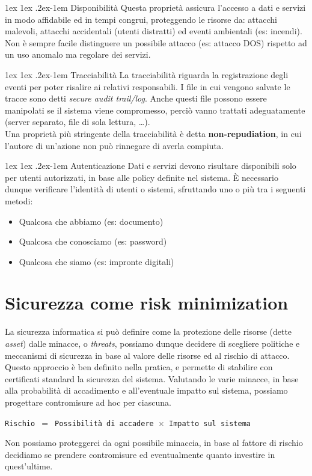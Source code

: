 \documentclass[a4paper, 11pt, notitlepage, fleqn]{report}
\makeatletter
\renewcommand{\paragraph}{%
	\@startsection{paragraph}{4}%
	{\z@}{1ex \@plus 1ex \@minus .2ex}{-1em}%
	{\normalfont\normalsize\bfseries}%
}
\makeatother
\begin{document}
\paragraph{Disponibilità}
Questa proprietà assicura l'accesso a dati e servizi in modo affidabile ed in tempi congrui, proteggendo le risorse da: attacchi malevoli, attacchi accidentali (utenti distratti) ed eventi ambientali (es: incendi).\\
Non è sempre facile distinguere un possibile attacco (es: attacco DOS) rispetto ad un uso anomalo ma regolare dei servizi.

\paragraph{Tracciabilità}
La tracciabilità riguarda la registrazione degli eventi per poter risalire ai relativi responsabili. I file in cui vengono salvate le tracce sono detti \emph{secure audit trail/log}. Anche questi file possono essere manipolati se il sistema viene compromesso, perciò vanno trattati adeguatamente (server separato, file di sola lettura, \dots).\\
Una proprietà più stringente della tracciabilità è detta \textbf{non-repudiation}, in cui l'autore di un'azione non può rinnegare di averla compiuta.

\paragraph{Autenticazione}
Dati e servizi devono risultare disponibili solo per utenti autorizzati, in base alle policy definite nel sistema. \`E necessario dunque verificare l'identità di utenti o sistemi, sfruttando uno o più tra i seguenti metodi:
\begin{itemize}
	\item Qualcosa che abbiamo (es: documento)
	\item Qualcosa che conosciamo (es: password)
	\item Qualcosa che siamo (es: impronte digitali)
\end{itemize}


\section{Sicurezza come risk minimization}
La sicurezza informatica si può definire come la protezione delle risorse (dette \emph{asset}) dalle minacce, o \emph{threats}, possiamo dunque decidere di scegliere politiche e meccanismi di sicurezza in base al valore delle risorse ed al rischio di attacco. Questo approccio è ben definito nella pratica, e permette di stabilire con certificati standard la sicurezza del sistema. Valutando le varie minacce, in base alla probabilità di accadimento e all'eventuale impatto sul sistema, possiamo progettare contromisure ad hoc per ciascuna.
\begin{center}
	\texttt{Rischio $=$ Possibilità di accadere $\times$ Impatto sul sistema}
\end{center}
Non possiamo proteggerci da ogni possibile minaccia, in base al fattore di rischio decidiamo se prendere contromisure ed eventualmente quanto investire in quest'ultime.
\end{document}
